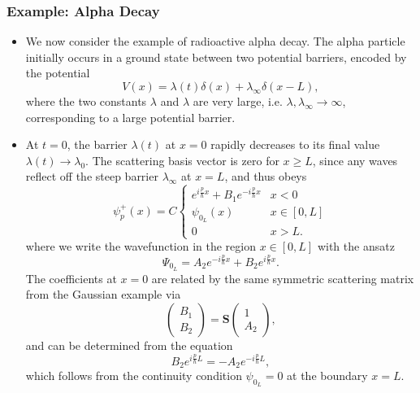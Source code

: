 \documentclass[11pt, a4paper]{article}
\newcommand{\mat}[1]{\mathbf{#1}}  %
\renewcommand{\SS}{\mat{S}}  %
\begin{document}
\subsubsection{Example: Alpha Decay}
\begin{itemize}
    \item We now consider the example of radioactive alpha decay. The alpha particle initially occurs in a ground state between two potential barriers, encoded by the potential
    \begin{equation*}
        V(x) = \lambda(t)\delta(x) + \lambda_{\infty}\delta(x - L),
    \end{equation*}
    where the two constants $ \lambda $ and $ \lambda $ are very large, i.e. $ \lambda, \lambda_{\infty} \to \infty $, corresponding to a large potential barrier.

    \item At $ t = 0 $, the barrier $ \lambda(t) $ at $ x = 0 $ rapidly decreases to its final value $ \lambda(t) \to \lambda_{0} $. The scattering basis vector is zero for $ x \geq L $, since any waves reflect off the steep barrier $ \lambda_{\infty} $ at $ x = L $, and thus obeys
    \begin{equation*}
        \psi_{p}^{+}(x) = C
        \begin{cases}
            e^{i \frac{p}{\hbar} x} + B_{1} e^{-i \frac{p}{\hbar} x} & x < 0 \\
            \psi_{0_{L}}(x) & x \in [0, L]\\
            0 & x > L.
        \end{cases}
    \end{equation*}
    where we write the wavefunction in the region $ x \in [0, L] $ with the ansatz
    \begin{equation*}
        \Psi_{0_{L}} = A_{2} e^{-i \frac{p}{\hbar}x} + B_{2} e^{i \frac{p}{\hbar}x}.
    \end{equation*}
    The coefficients at $ x = 0 $ are related by the same symmetric scattering matrix from the Gaussian example via
    \begin{equation*}
        \begin{pmatrix}
            B_{1}\\
            B_{2}
        \end{pmatrix}
        = \SS
        \begin{pmatrix}
            1\\
            A_{2}
        \end{pmatrix},
    \end{equation*}
    and can be determined from the equation
    \begin{equation*}
        B_{2} e^{i \frac{p}{\hbar} L} = - A_{2} e^{-i \frac{p}{\hbar}L},
    \end{equation*}
    which follows from the continuity condition $ \psi_{0_{L}} = 0 $ at the boundary $ x = L $.


\end{itemize}
\end{document}
